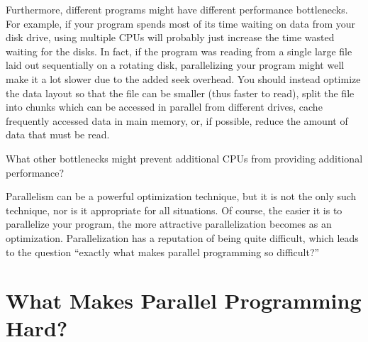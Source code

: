Furthermore, different programs might have different performance
bottlenecks.
For example, if your program spends most of its time
waiting on data from your disk drive,
using multiple CPUs will probably just increase the time wasted waiting
for the disks.
In fact, if the program was reading from a single large file laid out
sequentially on a rotating disk, parallelizing your program might
well make it a lot slower due to the added seek overhead.
You should instead optimize the data layout so that
the file can be smaller (thus faster to read), split the file into chunks
which can be accessed in parallel from different drives, 
cache frequently accessed data in main memory,
or, if possible,
reduce the amount of data that must be read.

\QuickQuiz{}
	What other bottlenecks might prevent additional CPUs from
	providing additional performance?
 \QuickQuizEnd

Parallelism can be a powerful optimization technique, but
it is not the only such technique, nor is it appropriate for all
situations.
Of course, the easier it is to parallelize your program, the
more attractive parallelization becomes as an optimization.
Parallelization has a reputation of being quite difficult,
which leads to the question ``exactly what makes parallel
programming so difficult?''

\section{What Makes Parallel Programming Hard?}
\label{sec:intro:What Makes Parallel Programming Hard?}

